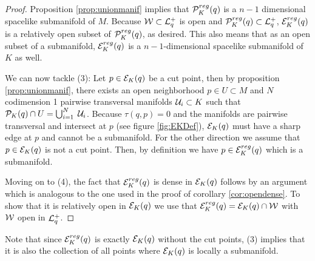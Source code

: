 \begin{proof}
Proposition \ref{prop:unionmanif} implies that ${\mathcal{P}}^{reg}_K(q)$ is a $n-1$ dimensional spacelike submanifold of $M$. Because ${\mathcal{W}}\subset {\mathcal{L}}^+_q$ is open and ${\mathcal{P}}^{reg}_K(q)\subset {\mathcal{L}}^+_q$, ${\mathcal{E}}^{reg}_K(q)$ is a relatively open subset of ${\mathcal{P}}^{reg}_K(q)$, as desired. This also means that as an open subset of a submanifold, ${\mathcal{E}}^{reg}_K(q)$ is a $n-1$-dimensional spacelike submanifold of $K$ as well.

We can now tackle (3): 
Let $p\in {\mathcal{E}}_K(q)$ be a cut point, then by proposition \ref{prop:unionmanif}, there exists an open neighborhood $p\in U \subset M$ and $N$ codimension 1 pairwise transversal manifolds $\mathcal{U}_i\subset K$ such that ${\mathcal{P}}_K(q)\cap U = \bigcup_{i=1}^N \; \mathcal{U}_i$. Because $\tau(q,p)=0$ and the manifolds are pairwise transversal and intersect at $p$ (see figure \ref{fig:EKDef}), ${\mathcal{E}}_K(q)$ must have a sharp edge at $p$ and cannot be a submanifold. For the other direction we assume that $p\in {\mathcal{E}}_K(q)$ is not a cut point. Then, by definition we have $p\in {\mathcal{E}}^{reg}_K(q)$ which is a submanifold.

Moving on to (4), the fact that ${\mathcal{E}}^{reg}_K(q)$ is dense in  ${\mathcal{E}}_K(q)$ follows by an argument which is analogous to the one used in the proof of corollary \ref{cor:opendense}. To show that it is relatively open in ${\mathcal{E}}_K(q)$ we use that ${\mathcal{E}}^{reg}_K(q) = {\mathcal{E}}_K(q) \cap {\mathcal{W}}$ with ${\mathcal{W}}$ open in ${\mathcal{L}}^+_q$.
\end{proof}

Note that since ${\mathcal{E}}^{reg}_K(q)$ is exactly ${\mathcal{E}}_K(q)$ without the cut points, (3) implies that it is also the collection of all points where ${\mathcal{E}}_K(q)$ is locally a submanifold.

